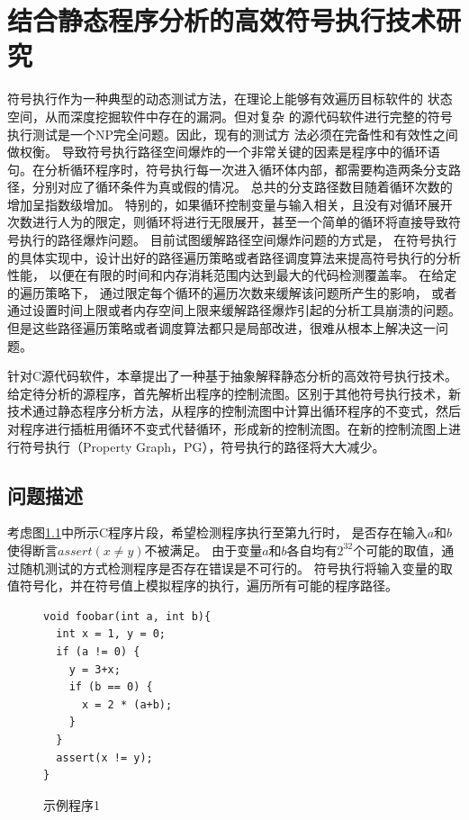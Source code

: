 
\chapter{结合静态程序分析的高效符号执行技术研究}
\label{chap-4}
符号执行作为一种典型的动态测试方法，在理论上能够有效遍历目标软件的
状态空间，从而深度挖掘软件中存在的漏洞。但对复杂
的源代码软件进行完整的符号执行测试是一个NP完全问题。因此，现有的测试方
法必须在完备性和有效性之间做权衡。%
导致符号执行路径空间爆炸的一个非常关键的因素是程序中的循环语句。在分析循环程序时，符号执行每一次进入循环体内部，都需要构造两条分支路径，分别对应了循环条件为真或假的情况。
总共的分支路径数目随着循环次数的增加呈指数级增加。
特别的，如果循环控制变量与输入相关，且没有对循环展开次数进行人为的限定，则循环将进行无限展开，甚至一个简单的循环将直接导致符号执行的路径爆炸问题。
目前试图缓解路径空间爆炸问题的方式是，
在符号执行的具体实现中，设计出好的路径遍历策略或者路径调度算法来提高符号执行的分析性能，
以便在有限的时间和内存消耗范围内达到最大的代码检测覆盖率。
在给定的遍历策略下，
通过限定每个循环的遍历次数来缓解该问题所产生的影响，
或者通过设置时间上限或者内存空间上限来缓解路径爆炸引起的分析工具崩溃的问题。
但是这些路径遍历策略或者调度算法都只是局部改进，很难从根本上解决这一问题。

针对C源代码软件，本章提出了一种基于抽象解释静态分析的高效符号执行技术。给定待分析的源程序，首先解析出程序的控制流图。区别于其他符号执行技术，新技术通过静态程序分析方法，从程序的控制流图中计算出循环程序的不变式，然后对程序进行插桩用循环不变式代替循环，形成新的控制流图。在新的控制流图上进行符号执行（Property Graph，PG），符号执行的路径将大大减少。

\section{问题描述}

考虑图\ref{fig-example1}中所示C程序片段，希望检测程序执行至第九行时，
是否存在输入$a$和$b$使得断言$assert(x \neq y)$不被满足。
由于变量$a$和$b$各自均有$2^{32}$个可能的取值，通过随机测试的方式检测程序是否存在错误是不可行的。
符号执行将输入变量的取值符号化，并在符号值上模拟程序的执行，遍历所有可能的程序路径。

\begin{figure}[h]
\begin{lstlisting}
void foobar(int a, int b){
  int x = 1, y = 0;
  if (a != 0) {
    y = 3+x;
	if (b == 0) {
	  x = 2 * (a+b);
	}
  }
  assert(x != y);
}
\end{lstlisting}
\caption{示例程序1}
\label{fig-example1}
\end{figure}

